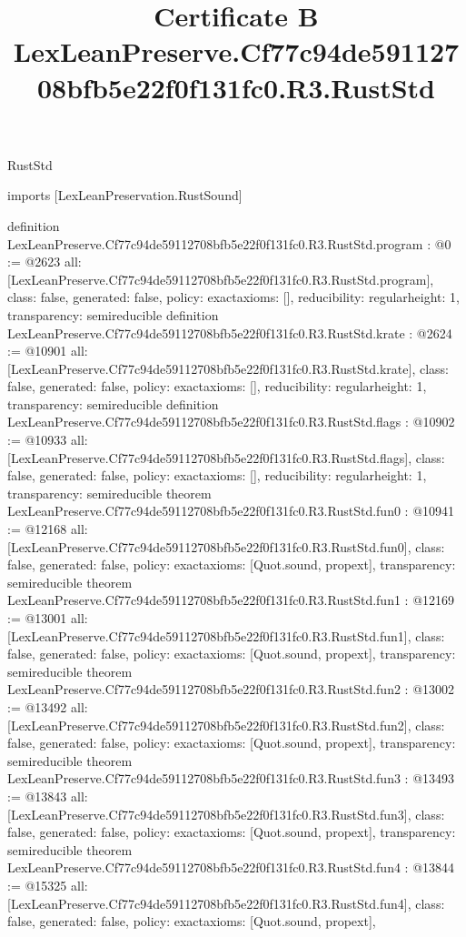 \begin{lexlean}{RustStd}
\title{Certificate B LexLeanPreserve.Cf77c94de59112708bfb5e22f0f131fc0.R3.RustStd}
\begin{coremodule}
imports [LexLeanPreservation.RustSound]

definition LexLeanPreserve.Cf77c94de59112708bfb5e22f0f131fc0.R3.RustStd.program : @0 := @2623 {
  all: [LexLeanPreserve.Cf77c94de59112708bfb5e22f0f131fc0.R3.RustStd.program],
  class: false,
  generated: false,
  policy: exact{axioms: []},
  reducibility: regular{height: 1},
  transparency: semireducible
}
definition LexLeanPreserve.Cf77c94de59112708bfb5e22f0f131fc0.R3.RustStd.krate : @2624 := @10901 {
  all: [LexLeanPreserve.Cf77c94de59112708bfb5e22f0f131fc0.R3.RustStd.krate],
  class: false,
  generated: false,
  policy: exact{axioms: []},
  reducibility: regular{height: 1},
  transparency: semireducible
}
definition LexLeanPreserve.Cf77c94de59112708bfb5e22f0f131fc0.R3.RustStd.flags : @10902 := @10933 {
  all: [LexLeanPreserve.Cf77c94de59112708bfb5e22f0f131fc0.R3.RustStd.flags],
  class: false,
  generated: false,
  policy: exact{axioms: []},
  reducibility: regular{height: 1},
  transparency: semireducible
}
theorem LexLeanPreserve.Cf77c94de59112708bfb5e22f0f131fc0.R3.RustStd.fun0 : @10941 := @12168 {
  all: [LexLeanPreserve.Cf77c94de59112708bfb5e22f0f131fc0.R3.RustStd.fun0],
  class: false,
  generated: false,
  policy: exact{axioms: [Quot.sound, propext]},
  transparency: semireducible
}
theorem LexLeanPreserve.Cf77c94de59112708bfb5e22f0f131fc0.R3.RustStd.fun1 : @12169 := @13001 {
  all: [LexLeanPreserve.Cf77c94de59112708bfb5e22f0f131fc0.R3.RustStd.fun1],
  class: false,
  generated: false,
  policy: exact{axioms: [Quot.sound, propext]},
  transparency: semireducible
}
theorem LexLeanPreserve.Cf77c94de59112708bfb5e22f0f131fc0.R3.RustStd.fun2 : @13002 := @13492 {
  all: [LexLeanPreserve.Cf77c94de59112708bfb5e22f0f131fc0.R3.RustStd.fun2],
  class: false,
  generated: false,
  policy: exact{axioms: [Quot.sound, propext]},
  transparency: semireducible
}
theorem LexLeanPreserve.Cf77c94de59112708bfb5e22f0f131fc0.R3.RustStd.fun3 : @13493 := @13843 {
  all: [LexLeanPreserve.Cf77c94de59112708bfb5e22f0f131fc0.R3.RustStd.fun3],
  class: false,
  generated: false,
  policy: exact{axioms: [Quot.sound, propext]},
  transparency: semireducible
}
theorem LexLeanPreserve.Cf77c94de59112708bfb5e22f0f131fc0.R3.RustStd.fun4 : @13844 := @15325 {
  all: [LexLeanPreserve.Cf77c94de59112708bfb5e22f0f131fc0.R3.RustStd.fun4],
  class: false,
  generated: false,
  policy: exact{axioms: [Quot.sound, propext]},
}
\end{coremodule}
\end{lexlean}
